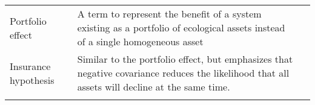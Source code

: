\begin{small}
\begin{longtable}{>{\RaggedRight}p{3.6cm}>{\RaggedRight}p{7.3cm}>{\RaggedRight}p{3.6cm}}
Portfolio effect &
A term to represent the benefit of a system existing as a portfolio of ecological assets instead of a single homogeneous asset &
\citep{schindler2010, thibaut2013}\\

Insurance hypothesis &
Similar to the portfolio effect, but emphasizes that negative covariance reduces the likelihood that all assets will decline at the same time. &
\citep{yachi1999,valone2008}\\

\bottomrule
\label{tab:theory}
\end{longtable}
\end{small}
